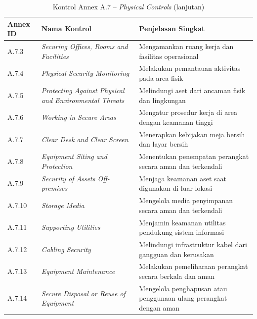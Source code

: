 \begin{table}[H]
\centering
\small
\caption{Kontrol Annex A.7 -- \textit{Physical Controls} (lanjutan) \cite{isoiec20227001}}
\label{tab:annex_a7_lanjutan}
\begin{tabular}{|P{1.6cm}|P{5.0cm}|P{6.4cm}|}
\hline
\textbf{Annex ID} & \textbf{Nama Kontrol} & \textbf{Penjelasan Singkat} \\
\hline
A.7.3  & \textit{Securing Offices, Rooms and Facilities}                & Mengamankan ruang kerja dan fasilitas operasional \\
\hline
A.7.4  & \textit{Physical Security Monitoring}                          & Melakukan pemantauan aktivitas pada area fisik \\
\hline
A.7.5  & \textit{Protecting Against Physical and Environmental Threats}  & Melindungi aset dari ancaman fisik dan lingkungan \\
\hline
A.7.6  & \textit{Working in Secure Areas}                               & Mengatur prosedur kerja di area dengan keamanan tinggi \\
\hline
A.7.7  & \textit{Clear Desk and Clear Screen}                           & Menerapkan kebijakan meja bersih dan layar bersih \\
\hline
A.7.8  & \textit{Equipment Siting and Protection}                       & Menentukan penempatan perangkat secara aman dan terkendali \\
\hline
A.7.9  & \textit{Security of Assets Off-premises}                       & Menjaga keamanan aset saat digunakan di luar lokasi \\
\hline
A.7.10 & \textit{Storage Media}                                         & Mengelola media penyimpanan secara aman dan terkendali \\
\hline
A.7.11 & \textit{Supporting Utilities}                                  & Menjamin keamanan utilitas pendukung sistem informasi \\
\hline
A.7.12 & \textit{Cabling Security}                                      & Melindungi infrastruktur kabel dari gangguan dan kerusakan \\
\hline
A.7.13 & \textit{Equipment Maintenance}                                 & Melakukan pemeliharaan perangkat secara berkala dan aman \\
\hline
A.7.14 & \textit{Secure Disposal or Reuse of Equipment}                 & Mengelola penghapusan atau penggunaan ulang perangkat dengan aman \\
\hline
\end{tabular}
\end{table}

